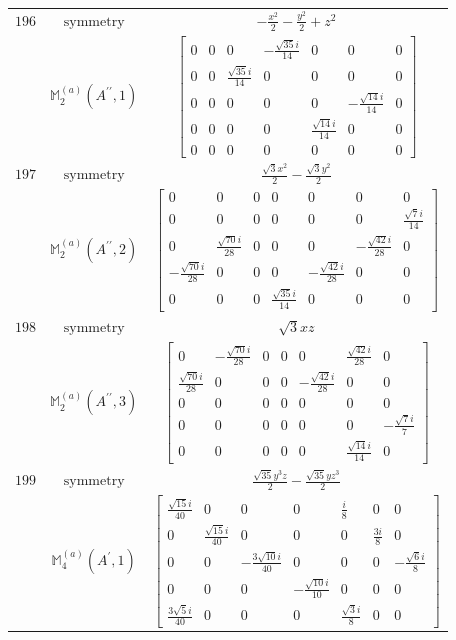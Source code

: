 \documentclass[fleqn,8pt,landscape]{jsarticle}
\begin{document}
\begin{longtable}{ccc}
$ 196 $ & $ \text{symmetry} $ & $ - \frac{x^{2}}{2} - \frac{y^{2}}{2} + z^{2} $ \\
$  $ & $ \mathbb{M}_{2}^{(a)}(A^{\prime\prime},1) $ & $ \begin{bmatrix} 0 & 0 & 0 & - \frac{\sqrt{35} i}{14} & 0 & 0 & 0 \\ 0 & 0 & \frac{\sqrt{35} i}{14} & 0 & 0 & 0 & 0 \\ 0 & 0 & 0 & 0 & 0 & - \frac{\sqrt{14} i}{14} & 0 \\ 0 & 0 & 0 & 0 & \frac{\sqrt{14} i}{14} & 0 & 0 \\ 0 & 0 & 0 & 0 & 0 & 0 & 0 \end{bmatrix} $ \\ \hline
$ 197 $ & $ \text{symmetry} $ & $ \frac{\sqrt{3} x^{2}}{2} - \frac{\sqrt{3} y^{2}}{2} $ \\
$  $ & $ \mathbb{M}_{2}^{(a)}(A^{\prime\prime},2) $ & $ \begin{bmatrix} 0 & 0 & 0 & 0 & 0 & 0 & 0 \\ 0 & 0 & 0 & 0 & 0 & 0 & \frac{\sqrt{7} i}{14} \\ 0 & \frac{\sqrt{70} i}{28} & 0 & 0 & 0 & - \frac{\sqrt{42} i}{28} & 0 \\ - \frac{\sqrt{70} i}{28} & 0 & 0 & 0 & - \frac{\sqrt{42} i}{28} & 0 & 0 \\ 0 & 0 & 0 & \frac{\sqrt{35} i}{14} & 0 & 0 & 0 \end{bmatrix} $ \\ \hline
$ 198 $ & $ \text{symmetry} $ & $ \sqrt{3} x z $ \\
$  $ & $ \mathbb{M}_{2}^{(a)}(A^{\prime\prime},3) $ & $ \begin{bmatrix} 0 & - \frac{\sqrt{70} i}{28} & 0 & 0 & 0 & \frac{\sqrt{42} i}{28} & 0 \\ \frac{\sqrt{70} i}{28} & 0 & 0 & 0 & - \frac{\sqrt{42} i}{28} & 0 & 0 \\ 0 & 0 & 0 & 0 & 0 & 0 & 0 \\ 0 & 0 & 0 & 0 & 0 & 0 & - \frac{\sqrt{7} i}{7} \\ 0 & 0 & 0 & 0 & 0 & \frac{\sqrt{14} i}{14} & 0 \end{bmatrix} $ \\ \hline
$ 199 $ & $ \text{symmetry} $ & $ \frac{\sqrt{35} y^{3} z}{2} - \frac{\sqrt{35} y z^{3}}{2} $ \\
$  $ & $ \mathbb{M}_{4}^{(a)}(A^{\prime},1) $ & $ \begin{bmatrix} \frac{\sqrt{15} i}{40} & 0 & 0 & 0 & \frac{i}{8} & 0 & 0 \\ 0 & \frac{\sqrt{15} i}{40} & 0 & 0 & 0 & \frac{3 i}{8} & 0 \\ 0 & 0 & - \frac{3 \sqrt{10} i}{40} & 0 & 0 & 0 & - \frac{\sqrt{6} i}{8} \\ 0 & 0 & 0 & - \frac{\sqrt{10} i}{10} & 0 & 0 & 0 \\ \frac{3 \sqrt{5} i}{40} & 0 & 0 & 0 & \frac{\sqrt{3} i}{8} & 0 & 0 \end{bmatrix} $ \\ \hline

\end{longtable}
\end{document}
